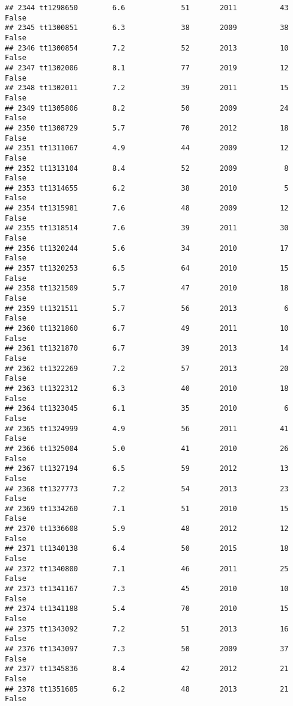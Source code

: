 \documentclass[
]{article}
\begin{document}
\begin{verbatim}
## 2344 tt1298650        6.6             51       2011          43   False
## 2345 tt1300851        6.3             38       2009          38   False
## 2346 tt1300854        7.2             52       2013          10   False
## 2347 tt1302006        8.1             77       2019          12   False
## 2348 tt1302011        7.2             39       2011          15   False
## 2349 tt1305806        8.2             50       2009          24   False
## 2350 tt1308729        5.7             70       2012          18   False
## 2351 tt1311067        4.9             44       2009          12   False
## 2352 tt1313104        8.4             52       2009           8   False
## 2353 tt1314655        6.2             38       2010           5   False
## 2354 tt1315981        7.6             48       2009          12   False
## 2355 tt1318514        7.6             39       2011          30   False
## 2356 tt1320244        5.6             34       2010          17   False
## 2357 tt1320253        6.5             64       2010          15   False
## 2358 tt1321509        5.7             47       2010          18   False
## 2359 tt1321511        5.7             56       2013           6   False
## 2360 tt1321860        6.7             49       2011          10   False
## 2361 tt1321870        6.7             39       2013          14   False
## 2362 tt1322269        7.2             57       2013          20   False
## 2363 tt1322312        6.3             40       2010          18   False
## 2364 tt1323045        6.1             35       2010           6   False
## 2365 tt1324999        4.9             56       2011          41   False
## 2366 tt1325004        5.0             41       2010          26   False
## 2367 tt1327194        6.5             59       2012          13   False
## 2368 tt1327773        7.2             54       2013          23   False
## 2369 tt1334260        7.1             51       2010          15   False
## 2370 tt1336608        5.9             48       2012          12   False
## 2371 tt1340138        6.4             50       2015          18   False
## 2372 tt1340800        7.1             46       2011          25   False
## 2373 tt1341167        7.3             45       2010          10   False
## 2374 tt1341188        5.4             70       2010          15   False
## 2375 tt1343092        7.2             51       2013          16   False
## 2376 tt1343097        7.3             50       2009          37   False
## 2377 tt1345836        8.4             42       2012          21   False
## 2378 tt1351685        6.2             48       2013          21   False

\end{verbatim}
\end{document}
